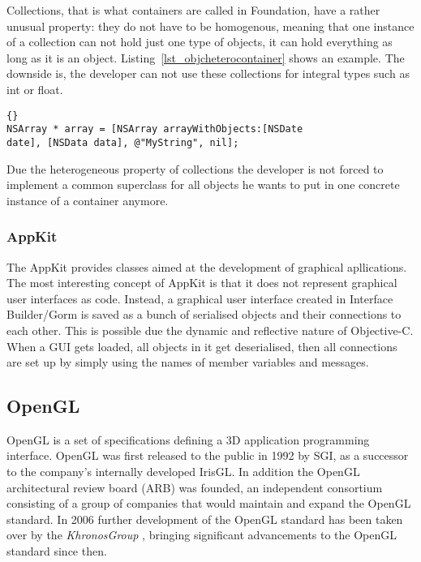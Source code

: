 Collections, that is what containers are called in Foundation, have a rather
unusual property: they do not have to be homogenous, meaning that one instance
of a collection can not hold just one type of objects, it can hold everything
as long as it is an object. Listing~\ref{lst_objcheterocontainer} shows an
example. The downside is, the developer can not use these collections for
integral types such as int or float.

\begin{lstlisting}[captionpos=b, caption=Argument with class type information.,
label=lst_objcheterocontainer]{}
NSArray * array = [NSArray arrayWithObjects:[NSDate
date], [NSData data], @"MyString", nil];
\end{lstlisting}

Due the heterogeneous property of collections the developer is not forced to
implement a common superclass for all objects he wants to put in one concrete
instance of a container anymore.

\subsubsection{AppKit}

The AppKit provides classes aimed at the development of graphical apllications.
The most interesting concept of AppKit is that it does not represent graphical
user interfaces as code. Instead, a graphical user interface created in
Interface Builder/Gorm is saved as a bunch of serialised objects and their
connections to each other. This is possible due the dynamic and reflective
nature of Objective-C. When a GUI gets loaded, all objects in it get
deserialised, then all connections are set up by simply using the names of
member variables and messages. 

\subsection{OpenGL}
OpenGL is a set of specifications defining a 3D application programming
interface. OpenGL was first released to the public in 1992 by SGI, as a
successor to the company's internally developed IrisGL. In addition the OpenGL
architectural review board (ARB)\cite{misc:opengl-arb} was founded, an
independent consortium consisting of a group of companies that would maintain
and expand the OpenGL standard. In 2006 further development of the OpenGL
standard has been taken over by the \textit{KhronosGroup}
\cite{misc:opengl-khronos}, bringing significant advancements to the OpenGL
standard since then.

